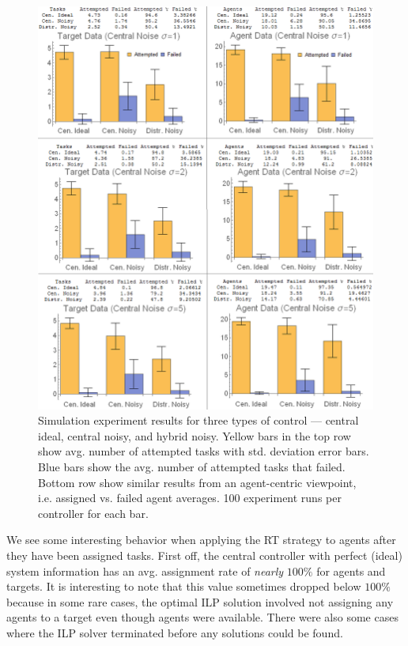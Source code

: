 \documentclass[12pt]{book}
\begin{document}
\begin{figure}[!ht]
	\centering\includegraphics[width=\textwidth]{../assets/staticExpResultsWithTables.png}
	\centering\caption{Simulation experiment results for three types of control --- central ideal, central noisy, and hybrid noisy. Yellow bars in the top row show avg. number of attempted tasks with std. deviation error bars. Blue bars show the avg. number of attempted tasks that failed. Bottom row show similar results from an agent-centric viewpoint, i.e. assigned vs. failed agent averages. 100 experiment runs per controller for each bar.}\label{fig:controlexpresults}
\end{figure}

We see some interesting behavior when applying the RT strategy to agents after they have been assigned tasks. First off, the central controller with perfect (ideal) system information has an avg. assignment rate of \textit{nearly} $100\%$ for agents and targets. It is interesting to note that this value sometimes dropped below $100\%$ because in some rare cases, the optimal ILP solution involved not assigning any agents to a target even though agents were available. There were also some cases where the ILP solver terminated before any solutions could be found.
\end{document}
